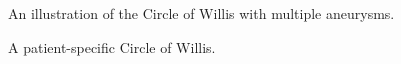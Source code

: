 \begin{figure}
  \begin{center}
  \end{center}
  \caption{An illustration of the Circle of Willis with multiple aneurysms.}
  \label{fig:textbook-circleII}
\end{figure}


\begin{figure}
  \begin{center}
  \end{center}
  \caption{A patient-specific Circle of Willis.}
  \label{fig:circle_kent}
\end{figure}

